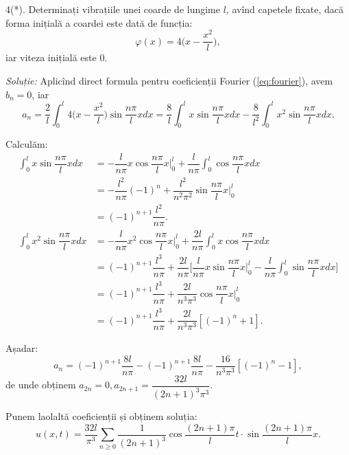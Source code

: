 \vspace{0.3cm}

4(*). Determinați vibrațiile unei coarde de lungime $ l $, avînd capetele fixate,
dacă forma inițială a coardei este dată de funcția:
\[
  \varphi(x) = 4 \Big( x - \dfrac{x^2}{l} \Big),
\]
iar viteza inițială este $ 0 $.

\vspace{0.3cm}

\emph{Soluție:} Aplicînd direct formula pentru coeficienții Fourier (\ref{eq:fourier}),
avem $ b_n = 0 $, iar
\[
  a_n = \dfrac{2}{l} \int_0^l 4\Big( x - \dfrac{x^2}{l} \Big) \sin \dfrac{n\pi}{l} xdx = %
  \dfrac{8}{l} \int_0^l x \sin \dfrac{n\pi}{l} xdx - %
  \dfrac{8}{l^2} \int_0^l x^2 \sin \dfrac{n\pi}{l}xdx.
\]

Calculăm:
\begin{align*}
  \int_0^l x\sin \dfrac{n\pi}{l} xdx &= -\dfrac{l}{n\pi} x \cos \dfrac{n\pi}{l}x \Big|_0^l + %
                                      \dfrac{l}{n\pi} \int_0^l \cos \dfrac{n\pi}{l} xdx \\
                                    &= -\dfrac{l^2}{n\pi}(-1)^n + %
                                      \dfrac{l^2}{n^2 \pi^2} \sin\dfrac{n\pi}{l} x\Big|_0^l \\
                                    &= (-1)^{n + 1} \dfrac{l^2}{n\pi}. \\
  \int_0^l x^2 \sin \dfrac{n\pi}{l} xdx &= -\dfrac{l}{n\pi}x^2 \cos \dfrac{n\pi}{l}x \Big|_0^l + %
                                         \dfrac{2l}{n\pi}\int_0^l x\cos \dfrac{n\pi}{l} xdx \\
                                    &= (-1)^{n + 1} \dfrac{l^3}{n\pi} + %
                                      \dfrac{2l}{n\pi}\Big[ \dfrac{l}{n\pi} x\sin \dfrac{n\pi}{l}x\Big|_0^l - \dfrac{l}{n\pi}\int_0^l \sin \dfrac{n\pi}{l}xdx \Big] \\
                                    &= (-1)^{n + 1}\dfrac{l^3}{n\pi} + %
                                      \dfrac{2l}{n^3 \pi^3}\cos \dfrac{n\pi}{l}x\Big|_0^l \\
                                    &= (-1)^{n + 1} \dfrac{l^3}{n\pi} + \dfrac{2l}{n^3 \pi^3}[(-1)^n + 1].
\end{align*}

Așadar:
\[
  a_n = (-1)^{n + 1} \dfrac{8l}{n\pi} - (-1)^{n + 1}\dfrac{8l}{n\pi} - %
  \dfrac{16}{n^3 \pi^3}[(-1)^n - 1],
\]
de unde obținem $ a_{2n} = 0, a_{2n+1} = \dfrac{32l}{(2n + 1)^3 \pi^3} $.

Punem laolaltă coeficienții și obținem soluția:
\[
  u(x, t) = \dfrac{32l}{\pi^3} \sum_{n \geq 0} \dfrac{1}{(2n + 1)^3} \cos\dfrac{(2n + 1)\pi}{l} t %
  \cdot \sin\dfrac{(2n + 1)\pi}{l} x.
\]

